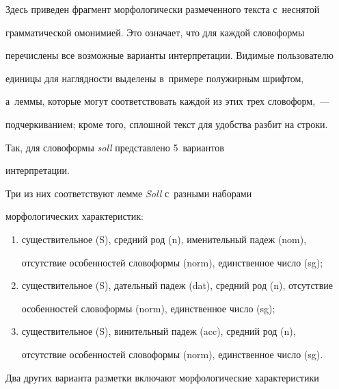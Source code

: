   


  \medskip


  


 \noindent


  Здесь приведен фрагмент морфологически размеченного текста с~неснятой 


грамматической омонимией. Это означает, что для каждой словоформы 


пе\-ре\-чис\-ле\-ны все возможные варианты интерпретации. Видимые пользователю 


единицы для наглядности выделены в~примере полужирным шрифтом, 


а~леммы, которые могут соответствовать каждой из этих трех словоформ,~--- 


подчеркиванием; кроме того, сплошной текст для удобства разбит на строки.


  


  Так, для словоформы \textit{soll} представлено 5~вариантов 


интерпретации. 


  


  Три из них соответствуют лемме \textit{Soll} с~разными наборами 


морфологических характеристик:


  \begin{enumerate}[(1)]


\item существительное (S), средний род (n), именительный падеж (nom), 


отсутствие особенностей словоформы (norm), единственное число (sg);


\item существительное (S), дательный падеж (dat), средний род (n), отсутствие 


особенностей словоформы (norm), единственное число (sg);


\item существительное (S), винительный падеж (acc), средний род (n), 


отсутствие особенностей словоформы (norm), единственное число (sg).


\end{enumerate}





  Два других варианта разметки включают морфологические характеристики 


